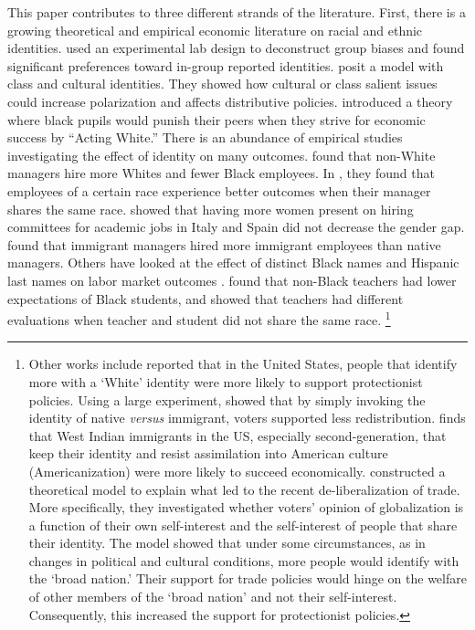 \documentclass[12pt, fullpage]{article}
\begin{document}
This paper contributes to three different strands of the literature. First, there is a growing theoretical and empirical economic literature on racial and ethnic identities. \citet{krantonDeconstructingBiasSocial2020} used an experimental lab design to deconstruct group biases and found significant preferences toward in-group reported identities. \citet{bonomiIdentityBeliefsPolitical2021} posit a model with class and cultural identities. They showed how cultural or class salient issues could increase polarization and affects distributive policies. \citet{fryerEmpiricalAnalysisActing2010a} introduced a theory where black pupils would punish their peers when they strive for economic success by ``Acting White.'' There is an abundance of empirical studies investigating the effect of identity on many outcomes. \citet{giulianoManagerRaceRace2009} found that non-White managers hire more Whites and fewer Black employees. In \citet{giulianoRacialBiasManagerEmployee2011}, they found that employees of a certain race experience better outcomes when their manager shares the same race. \citet{baguesDoesGenderComposition2017} showed that having more women present on hiring committees for academic jobs in Italy and Spain did not decrease the gender gap. \cite{aslundSeekingSimilarityHow2014} found that immigrant managers hired more immigrant employees than native managers. Others have looked at the effect of distinct Black names and Hispanic last names on labor market outcomes \citep{bertrandAreEmilyGreg2004,fryerCausesConsequencesDistinctively2004a,hadahImpactHispanicLast2020}. \citet{gershensonWhoBelievesMe2016} found that non-Black teachers had lower expectations of Black students, and \citet{deeTeacherMeDoes2005} showed that teachers had different evaluations when teacher and student did not share the same race. \footnote{Other works include \citet{jardinaWhiteIdentityPolitics2019} reported that in the United States, people that identify more with a `White' identity were more likely to support protectionist policies. Using a large experiment, \citet{alesinaImmigrationRedistribution2018} showed that by simply invoking the identity of native \emph{versus} immigrant, voters supported less redistribution. \citet{watersBlackIdentitiesWest2001} finds that West Indian immigrants in the US, especially second-generation, that keep their identity and resist assimilation into American culture (Americanization) were more likely to succeed economically. \citet{grossmanIdentityPoliticsTrade2021} constructed a theoretical model to explain what led to the recent de-liberalization of trade. More specifically, they investigated whether voters' opinion of globalization is a function of their own self-interest and the self-interest of people that share their identity. The model showed that under some circumstances, as in changes in political and cultural conditions, more people would identify with the `broad nation.' Their support for trade policies would hinge on the welfare of other members of the `broad nation' and not their self-interest. Consequently, this increased the support for protectionist policies.}
\end{document}
